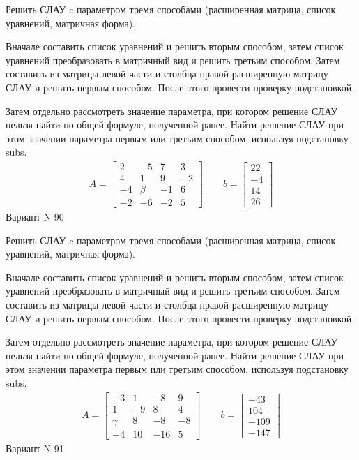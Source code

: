 \documentclass[11pt]{report}
\begin{document}
Решить СЛАУ c параметром тремя способами (расширенная матрица, список уравнений, матричная форма).

Вначале составить список уравнений и решить вторым способом,
затем список уравнений преобразовать в матричный вид и решить третьим способом.
Затем составить из матрицы левой части и столбца правой расширенную матрицу СЛАУ и решить первым способом.
После этого провести проверку подстановкой.

Затем отдельно рассмотреть значение параметра, при котором решение СЛАУ нельзя найти по общей формуле,
полученной ранее.
Найти решение СЛАУ при этом значении параметра первым или третьим способом, используя подстановку subs.
\begin{align*}
    A = \left[\begin{matrix}2 & -5 & 7 & 3\\4 & 1 & 9 & -2\\-4 & \beta & -1 & 6\\-2 & -6 & -2 & 5\end{matrix}\right]
\qquad b = \left[\begin{matrix}22\\-4\\14\\26\end{matrix}\right]
\end{align*}
\newpage
Вариант N 90


Решить СЛАУ c параметром тремя способами (расширенная матрица, список уравнений, матричная форма).

Вначале составить список уравнений и решить вторым способом,
затем список уравнений преобразовать в матричный вид и решить третьим способом.
Затем составить из матрицы левой части и столбца правой расширенную матрицу СЛАУ и решить первым способом.
После этого провести проверку подстановкой.

Затем отдельно рассмотреть значение параметра, при котором решение СЛАУ нельзя найти по общей формуле,
полученной ранее.
Найти решение СЛАУ при этом значении параметра первым или третьим способом, используя подстановку subs.
\begin{align*}
    A = \left[\begin{matrix}-3 & 1 & -8 & 9\\1 & -9 & 8 & 4\\\gamma & 8 & -8 & -8\\-4 & 10 & -16 & 5\end{matrix}\right]
\qquad b = \left[\begin{matrix}-43\\104\\-109\\-147\end{matrix}\right]
\end{align*}
\newpage
Вариант N 91
\end{document}
